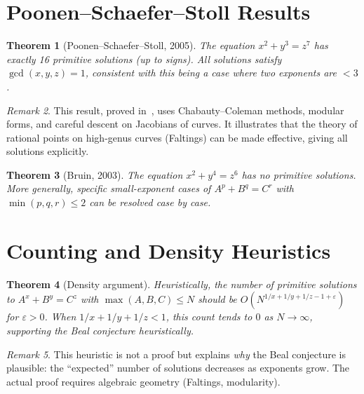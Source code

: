\documentclass[12pt,a4paper]{amsart}
\newtheorem{theorem}{Theorem}[section]
\theoremstyle{definition}
\theoremstyle{remark}
\newtheorem{remark}[theorem]{Remark}
\begin{document}
\section{Poonen--Schaefer--Stoll Results}

\begin{theorem}[Poonen--Schaefer--Stoll, 2005]\label{thm:PSS}
The equation $x^2 + y^3 = z^7$ has exactly 16 primitive solutions (up to signs).
All solutions satisfy $\gcd(x,y,z) = 1$, consistent with this being a case where
two exponents are $< 3$.
\end{theorem}

\begin{remark}
This result, proved in~\cite{PSS07}, uses Chabauty--Coleman methods, modular
forms, and careful descent on Jacobians of curves. It illustrates that the
theory of rational points on high-genus curves (Faltings) can be made effective,
giving all solutions explicitly.
\end{remark}

\begin{theorem}[Bruin, 2003]\label{thm:bruin}
The equation $x^2 + y^4 = z^6$ has no primitive solutions. More generally,
specific small-exponent cases of $A^p + B^q = C^r$ with $\min(p,q,r) \leq 2$
can be resolved case by case.
\end{theorem}

\section{Counting and Density Heuristics}

\begin{theorem}[Density argument]\label{thm:density}
Heuristically, the number of primitive solutions to $A^x + B^y = C^z$ with
$\max(A,B,C) \leq N$ should be $O(N^{1/x + 1/y + 1/z - 1 + \varepsilon})$ for
$\varepsilon > 0$. When $1/x + 1/y + 1/z < 1$, this count tends to $0$ as
$N \to \infty$, supporting the Beal conjecture heuristically.
\end{theorem}

\begin{remark}
This heuristic is not a proof but explains \emph{why} the Beal conjecture is
plausible: the ``expected'' number of solutions decreases as exponents grow.
The actual proof requires algebraic geometry (Faltings, modularity).
\end{remark}
\end{document}
